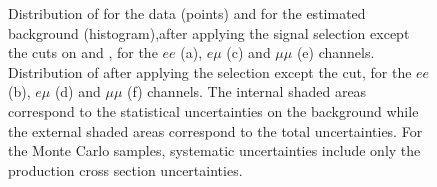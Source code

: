 \begin{figure}[t]
\caption{Distribution of \met{} for the data (points) and for the estimated background (histogram),after applying the signal selection except the cuts on \met{} and \HT{}, for the $ee$ (a), $e\mu$ (c)
and $\mu\mu$ (e) channels. Distribution of \HT{} after applying the selection except the \HT{} cut, for the $ee$ (b), $e\mu$ (d) and $\mu\mu$ (f) channels. The internal shaded areas correspond to the
statistical uncertainties on the background while the external shaded areas correspond to the total uncertainties. For the Monte Carlo samples, systematic uncertainties include only the production cross section uncertainties.}\label{fig:signal}
\end{figure}







